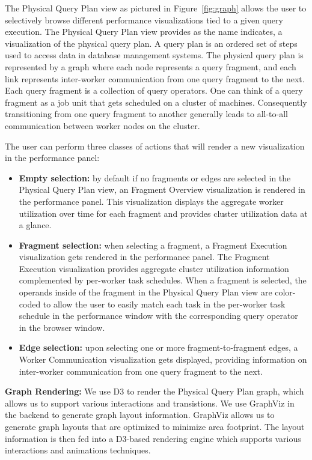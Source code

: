 \documentclass{chi2009}
\newcommand*{\graph}{Physical Query Plan\xspace}
\newcommand*{\fragment}{Fragment Execution\xspace}
\newcommand*{\network}{Worker Communication\xspace}
\newcommand*{\overall}{Fragment Overview\xspace}
\begin{document}
The \graph view as pictured in Figure~\ref{fig:graph} allows the user to selectively browse different performance visualizations tied to a given query execution. The \graph view provides as the name indicates, a visualization of the physical query plan. A query plan is an ordered set of steps used to access data in database management systems. The physical query plan is represented by a graph where each node represents a query fragment, and each link represents inter-worker communication from one query fragment to the next. Each query fragment is a collection of query operators. One can think of a query fragment as a job unit that gets scheduled on a cluster of machines. Consequently transitioning from one query fragment to another generally leads to all-to-all communication between worker nodes on the cluster. 


The user can perform three classes of actions that will render a new visualization in the performance panel:
\begin{itemize}

    \item \textbf{Empty selection:} by default if no fragments or edges are selected in the \graph view, an \overall visualization is rendered in the performance panel. This visualization displays the aggregate worker utilization over time for each fragment and provides cluster utilization data at a glance.
    \item \textbf{Fragment selection:} when selecting a fragment, a \fragment visualization gets rendered in the performance panel. The \fragment visualization provides aggregate cluster utilization information complemented by per-worker task schedules. When a fragment is selected, the operands inside of the fragment in the \graph view are color-coded to allow the user to easily match each task in the per-worker task schedule in the performance window with the corresponding query operator in the browser window.
    \item \textbf{Edge selection:} upon selecting one or more fragment-to-fragment edges, a \network visualization gets displayed, providing information on inter-worker communication from one query fragment to the next.

\end{itemize}

\textbf{Graph Rendering:} We use D3 \cite{d3} to render the \graph graph, which allows us to support various interactions and transistions. We use GraphViz \cite{Ellson01graphviz} in the backend to generate graph layout information. GraphViz allows us to generate graph layouts that are optimized to minimize area footprint. The layout information is then fed into a D3-based rendering engine which supports various interactions and animations techniques.
\end{document}
